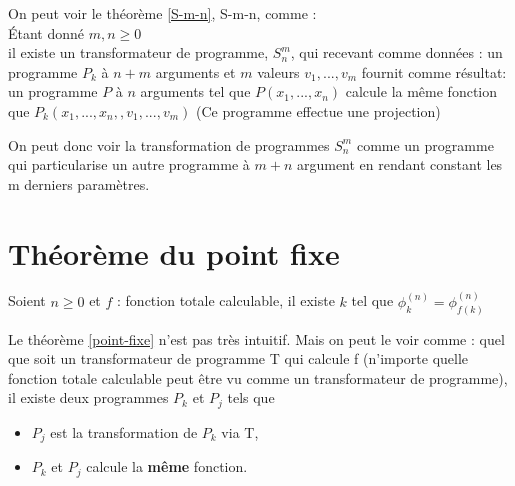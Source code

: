 \begin{myrem}
	On peut voir le théorème \ref{S-m-n}, S-m-n, comme : \\
	Étant donné $m,n \geq 0$\\
	il existe un transformateur de programme, $S^m_n$, qui recevant comme
	données : un programme $P_k$ à $n+m$ arguments et $m$ valeurs $v_1,...,v_m$
	fournit comme résultat: un programme $P$ à $n$ arguments tel que
	$P(x_1,...,x_n)$ calcule la même fonction que
	$P_k(x_1,...,x_n,,v_1,...,v_m)$ (Ce programme effectue une projection)
\end{myrem}

\begin{myrem}
	On peut donc voir la transformation de programmes $S^m_n$ comme un
	programme qui particularise un autre programme à $m+n$ argument en rendant
	constant les m derniers paramètres.
\end{myrem}

\section{Théorème du point fixe}
\label{sub:th_or_me_du_point_fixe}
\begin{mytheo}
	\label{point-fixe}
    Soient $n \geq 0$ et $f$ : fonction totale
	calculable, il existe $k$ tel que $\phi^{(n)}_k = \phi^{(n)}_{f(k)}$
\end{mytheo}

\begin{myrem}
	Le théorème \ref{point-fixe} n'est pas très intuitif. Mais on peut le
	voir comme : quel que soit un transformateur de programme T qui calcule f (n'importe quelle fonction totale calculable peut être vu comme un transformateur	de programme),
	il existe deux programmes $P_k$ et $P_j$ tels que
	\begin{itemize}
		\item $P_j$ est la transformation de $P_k$ via T,
		\item $P_k$ et $P_j$ calcule la \textbf{même} fonction.
	\end{itemize}
\end{myrem}

